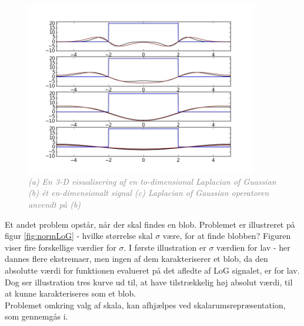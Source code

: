 \begin{figure}[H]
    \centering
    \includegraphics[width=0.90\textwidth]{fig/normLoG.jpg}
    \vspace{-0.5em}   
    \begin{center}
    \caption{\textcolor{gray}{\footnotesize \textit{
    (a) En 3-D visualisering af en to-dimensional Laplacian of Guassian (b) ét en-dimensionalt signal (c) Laplacian of Gaussian operatoren anvendt på (b)}}}
    \label{fig:normLoG}
     \end{center}
  \end{figure}
       \vspace{-2.5em}
\noindent
Et andet problem opstår, når der skal findes en blob. Problemet er illustreret på figur \eqref{fig:normLoG} - hvilke størrelse skal $\sigma$ være, for at finde blobben? Figuren viser fire forskellige værdier for $\sigma$. I første illustration er $\sigma$ værdien for lav - her dannes flere ekstremaer, men ingen af dem karakteriserer et blob, da den absolutte værdi for funktionen evalueret på det afledte af LoG signalet, er for lav. Dog ser illustration tres kurve ud til, at have tilstrækkelig høj absolut værdi, til at kunne karakteriseres som et blob. \\
Problemet omkring valg af skala, kan afhjælpes ved skalarumsrepræsentation, som gennemgås i.

